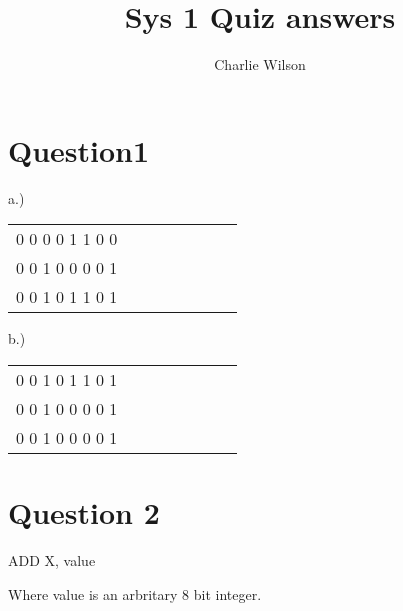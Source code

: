 \documentclass[11pt]{article}
\title{\textbf{Sys 1 Quiz answers}}
\author{Charlie Wilson}
\date{}
\begin{document}
\usepackage{listings}
\maketitle
\thispagestyle{empty}

\section{Question1}
a.)
\begin{center}
\begin{tabular}{ c c c c c c c c }
	  0 0 0 0 1 1 0 0 \\
	  0 0 1 0 0 0 0 1 \\
	  \hline
	0 0 1 0 1 1 0 1
	 
\end{tabular}
\end{center}
b.)
\begin{center}
\begin{tabular}{ c c c c c c c c }
	  0 0 1 0 1 1 0 1 \\
	  0 0 1 0 0 0 0 1 \\
	  \hline
	0 0 1 0 0 0 0 1
\end{tabular}
\end{center}
\section{Question 2}
\begin{center}
ADD X, value
\end{center}
Where value is an arbritary 8 bit integer.
\end{document}
